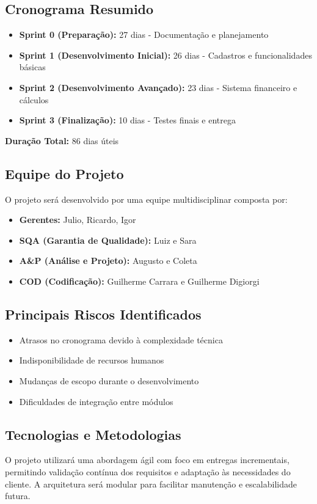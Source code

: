 \subsection{Cronograma Resumido}
\begin{itemize}
    \item \textbf{Sprint 0 (Preparação):} 27 dias - Documentação e planejamento
    \item \textbf{Sprint 1 (Desenvolvimento Inicial):} 26 dias - Cadastros e funcionalidades básicas
    \item \textbf{Sprint 2 (Desenvolvimento Avançado):} 23 dias - Sistema financeiro e cálculos
    \item \textbf{Sprint 3 (Finalização):} 10 dias - Testes finais e entrega
\end{itemize}

\textbf{Duração Total:} 86 dias úteis

\subsection{Equipe do Projeto}
O projeto será desenvolvido por uma equipe multidisciplinar composta por:
\begin{itemize}
    \item \textbf{Gerentes:} Julio, Ricardo, Igor
    \item \textbf{SQA (Garantia de Qualidade):} Luiz e Sara
    \item \textbf{A\&P (Análise e Projeto):} Augusto e Coleta
    \item \textbf{COD (Codificação):} Guilherme Carrara e Guilherme Digiorgi
\end{itemize}

\subsection{Principais Riscos Identificados}
\begin{itemize}
    \item Atrasos no cronograma devido à complexidade técnica
    \item Indisponibilidade de recursos humanos
    \item Mudanças de escopo durante o desenvolvimento
    \item Dificuldades de integração entre módulos
\end{itemize}

\subsection{Tecnologias e Metodologias}
O projeto utilizará uma abordagem ágil com foco em entregas incrementais, permitindo validação contínua dos requisitos e adaptação às necessidades do cliente. A arquitetura será modular para facilitar manutenção e escalabilidade futura.
